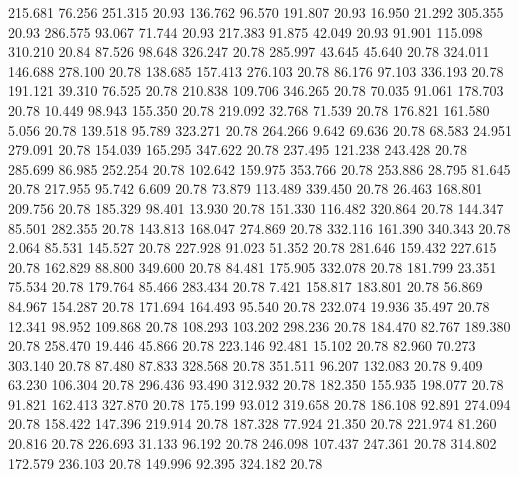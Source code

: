  215.681   76.256  251.315        20.93
 136.762   96.570  191.807        20.93
  16.950   21.292  305.355        20.93
 286.575   93.067   71.744        20.93
 217.383   91.875   42.049        20.93
  91.901  115.098  310.210        20.84
  87.526   98.648  326.247        20.78
 285.997   43.645   45.640        20.78
 324.011  146.688  278.100        20.78
 138.685  157.413  276.103        20.78
  86.176   97.103  336.193        20.78
 191.121   39.310   76.525        20.78
 210.838  109.706  346.265        20.78
  70.035   91.061  178.703        20.78
  10.449   98.943  155.350        20.78
 219.092   32.768   71.539        20.78
 176.821  161.580    5.056        20.78
 139.518   95.789  323.271        20.78
 264.266    9.642   69.636        20.78
  68.583   24.951  279.091        20.78
 154.039  165.295  347.622        20.78
 237.495  121.238  243.428        20.78
 285.699   86.985  252.254        20.78
 102.642  159.975  353.766        20.78
 253.886   28.795   81.645        20.78
 217.955   95.742    6.609        20.78
  73.879  113.489  339.450        20.78
  26.463  168.801  209.756        20.78
 185.329   98.401   13.930        20.78
 151.330  116.482  320.864        20.78
 144.347   85.501  282.355        20.78
 143.813  168.047  274.869        20.78
 332.116  161.390  340.343        20.78
   2.064   85.531  145.527        20.78
 227.928   91.023   51.352        20.78
 281.646  159.432  227.615        20.78
 162.829   88.800  349.600        20.78
  84.481  175.905  332.078        20.78
 181.799   23.351   75.534        20.78
 179.764   85.466  283.434        20.78
   7.421  158.817  183.801        20.78
  56.869   84.967  154.287        20.78
 171.694  164.493   95.540        20.78
 232.074   19.936   35.497        20.78
  12.341   98.952  109.868        20.78
 108.293  103.202  298.236        20.78
 184.470   82.767  189.380        20.78
 258.470   19.446   45.866        20.78
 223.146   92.481   15.102        20.78
  82.960   70.273  303.140        20.78
  87.480   87.833  328.568        20.78
 351.511   96.207  132.083        20.78
   9.409   63.230  106.304        20.78
 296.436   93.490  312.932        20.78
 182.350  155.935  198.077        20.78
  91.821  162.413  327.870        20.78
 175.199   93.012  319.658        20.78
 186.108   92.891  274.094        20.78
 158.422  147.396  219.914        20.78
 187.328   77.924   21.350        20.78
 221.974   81.260   20.816        20.78
 226.693   31.133   96.192        20.78
 246.098  107.437  247.361        20.78
 314.802  172.579  236.103        20.78
 149.996   92.395  324.182        20.78
